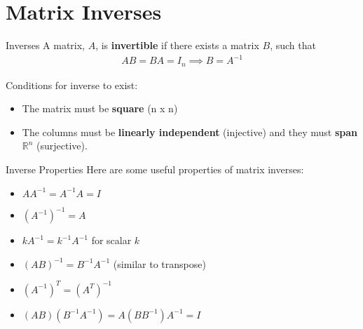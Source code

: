 \section{Matrix Inverses}

\begin{frame}{Inverses}
    A matrix, $A$, is \textbf{invertible} if there exists a matrix $B$, such that
    \begin{align*}
        AB = BA = I_n \implies B = A^{-1}
    \end{align*}
    
    Conditions for inverse to exist:
    \begin{itemize}
        \item The matrix must be \textbf{square} (n x n)
        \item The columns must be \textbf{linearly independent} (injective) and they must \textbf{span} $\mathbb{R}^n$ (surjective).
    \end{itemize}
\end{frame}

\begin{frame}{Inverse Properties}
    Here are some useful properties of matrix inverses:
    \begin{itemize}
        \item $AA^{-1} = A^{-1}A = I$
        \item $(A^{-1})^{-1} = A$
        \item $kA^{-1} = k^{-1}A^{-1}$ for scalar $k$
        \item $(AB)^{-1} = B^{-1}A^{-1}$ (similar to transpose)
        \item $(A^{-1})^T = (A^T)^{-1}$
        \item $(AB) (B^{-1}A^{-1}) = A (BB^{-1}) A^{-1} = I$
    \end{itemize}
\end{frame}

